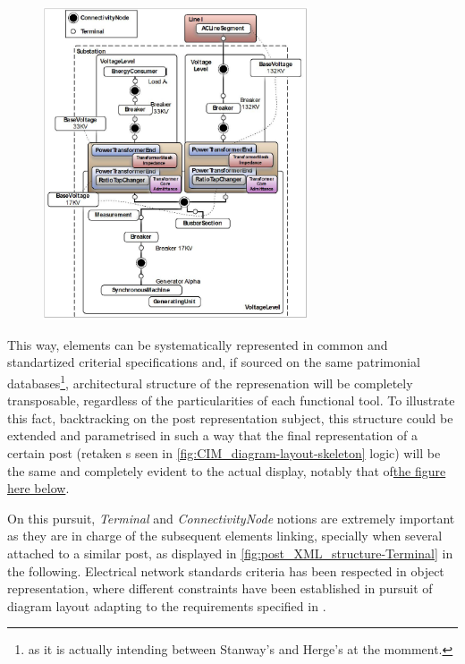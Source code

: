 \begin{figure}[h!]
    \centering
    \parbox[t]{0.7\textwidth}{
    \href{}{\includegraphics[width=0.7\textwidth]{0.figuras/example_CIM_mapping_UML-structure.png}}
    \label{fig:CIM_diagram-layout-skeleton}}
\end{figure}

This way, elements can be systematically represented in common and standartized criterial specifications and, if sourced on the same patrimonial databases\footnote{as it is actually intending between Stanway's and Herge's at the momment.}, architectural structure of the represenation will be completely transposable, regardless of the particularities of each functional tool. To illustrate this fact, backtracking on the post representation subject, this structure could be extended and parametrised in such a way that the final representation of a certain post (retaken s seen in \autoref{fig:CIM_diagram-layout-skeleton} logic) will be the same and completely evident to the actual display, notably that of\hyperref[fig:CIM_diagram-layout]{the figure here below}.

On this pursuit, \textit{Terminal} and \textit{ConnectivityNode} notions are extremely important as they are in charge of the subsequent elements linking, specially when several attached to a similar post, as displayed in \autoref{fig:post_XML_structure-Terminal} in the following. Electrical network standards criteria has been respected in object representation, where different constraints have been established in pursuit of diagram layout adapting to the requirements specified in \cite{CIMIntelliGrid}.

